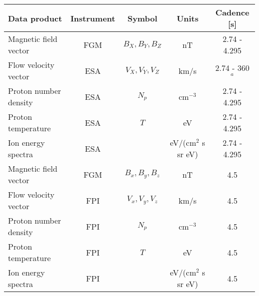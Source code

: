 \begin{tabular}{lcccc}
\hline
Data product          & Instrument & Symbol           & Units        & Cadence [s] \\
\hline
Magnetic field vector 	& FGM      & $B_X, B_Y, B_Z$  & nT                   & 2.74 - 4.295 \\
Flow velocity vector  		& ESA       & $V_X, V_Y, V_Z$  & km/s                & 2.74 - 360$^a$ \\
Proton number density	& ESA       & $N_p$            	& cm$^{-3}$       & 2.74 - 4.295 \\
Proton temperature    	& ESA       & $T$            		& eV                   & 2.74 - 4.295 \\
Ion energy spectra    	& ESA       &                  		& eV/(cm$^2$ s sr eV)  & 2.74 - 4.295 \\
\hline
Magnetic field vector 	& FGM      & $B_x, B_y, B_z$  & nT                     & 4.5 \\
Flow velocity vector  		& FPI        & $V_x, V_y, V_z$  & km/s                  & 4.5 \\
Proton number density 	& FPI        & $N_p$            	& cm$^{-3}$        & 4.5 \\
Proton temperature    	& FPI        & $T$            		& eV                    & 4.5 \\
Ion energy spectra   		& FPI        &                  		& eV/(cm$^2$ s sr eV)  & 4.5 \\
\hline
\end{tabular}